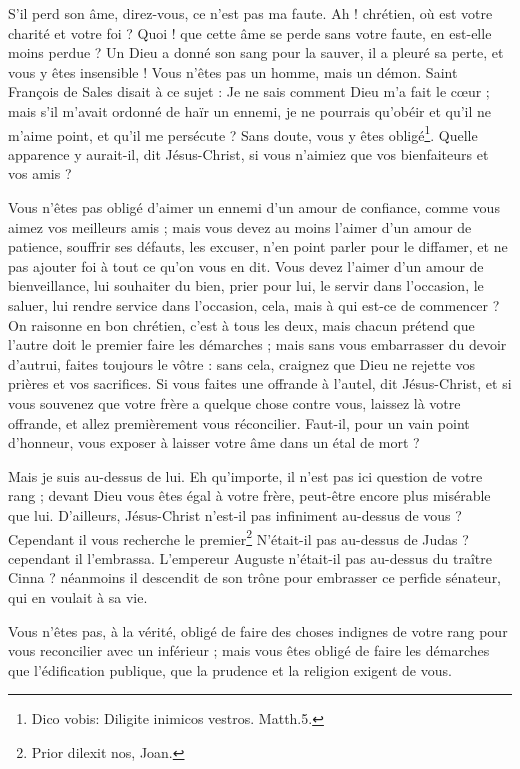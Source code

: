 \documentclass[instructions.tex]{subfiles}
\begin{document}
S'il perd son âme, direz-vous, ce n'est pas ma faute. Ah ! chrétien, où est votre charité et votre foi ? Quoi ! que cette âme se perde sans votre faute, en est-elle moins perdue ? Un Dieu a donné son sang pour la sauver, il a pleuré sa perte, et vous y êtes insensible ! Vous n'êtes pas un homme, mais un démon. Saint François de Sales disait à ce sujet : Je ne sais comment Dieu m'a fait le cœur ; mais s'il m'avait ordonné de haïr un ennemi, je ne pourrais qu'obéir et qu'il ne m'aime point, et qu'il me persécute ? Sans doute, vous y êtes obligé\footnote{Dico vobis: Diligite inimicos vestros. Matth.5.}. Quelle apparence y aurait-il, dit Jésus-Christ, si vous n'aimiez que vos bienfaiteurs et vos amis ?
 
Vous n'êtes pas obligé d'aimer un ennemi d'un amour de confiance, comme vous aimez vos meilleurs amis ; mais vous devez au moins l'aimer d'un amour de patience, souffrir ses défauts, les excuser, n'en point parler pour le diffamer, et ne pas ajouter foi à tout ce qu'on vous en dit. Vous devez l'aimer d'un amour de bienveillance, lui souhaiter du bien, prier pour lui, le servir dans l'occasion, le saluer, lui rendre service dans l'occasion, cela, mais à qui est-ce de commencer ? On raisonne en bon chrétien, c'est à tous les deux, mais chacun prétend que l'autre doit le premier faire les démarches ; mais sans vous embarrasser du devoir d'autrui, faites toujours le vôtre : sans cela, craignez que Dieu ne rejette vos prières et vos sacrifices. Si vous faites une offrande à l'autel, dit Jésus-Christ, et si vous souvenez que votre frère a quelque chose contre vous, laissez là votre offrande, et allez premièrement vous réconcilier. Faut-il, pour un vain point d'honneur, vous exposer à laisser votre âme dans un étal de mort ?
 
Mais je suis au-dessus de lui. Eh qu'importe, il n'est pas ici question de votre rang ; devant Dieu vous êtes égal à votre frère, peut-être encore plus misérable que lui. D'ailleurs, Jésus-Christ n'est-il pas infiniment au-dessus de vous ? Cependant il vous recherche le premier\footnote{Prior dilexit nos, Joan.} N'était-il pas au-dessus de Judas ? cependant il l'embrassa. L'empereur Auguste n'était-il pas au-dessus du traître Cinna ? néanmoins il descendit de son trône pour embrasser ce perfide sénateur, qui en voulait à sa vie.
 
Vous n'êtes pas, à la vérité, obligé de faire des choses indignes de votre rang pour vous reconcilier avec un inférieur ; mais vous êtes obligé de faire les démarches que l'édification publique, que la prudence et la religion exigent de vous.
 
\end{document}
